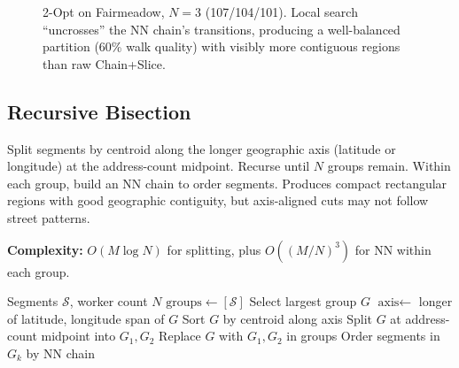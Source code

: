 \documentclass[conference]{IEEEtran}
\begin{document}
\begin{figure}[htbp]
\centering
{}
\caption{2-Opt on Fairmeadow, $N=3$ (107/104/101). Local search ``uncrosses'' the NN chain's transitions, producing a well-balanced partition (60\% walk quality) with visibly more contiguous regions than raw Chain+Slice.}
\end{figure}

\subsection{Recursive Bisection}

Split segments by centroid along the longer geographic axis (latitude or longitude) at the address-count midpoint. Recurse until $N$ groups remain. Within each group, build an NN chain to order segments. Produces compact rectangular regions with good geographic contiguity, but axis-aligned cuts may not follow street patterns.

\textbf{Complexity:} $O(M \log N)$ for splitting, plus $O((M/N)^3)$ for NN within each group.

\begin{algorithm}[htbp]
\caption{Recursive Bisection}
\begin{algorithmic}[1]
\REQUIRE Segments $\mathcal{S}$, worker count $N$
\STATE $\text{groups} \leftarrow [\mathcal{S}]$
    \STATE Select largest group $G$
    \STATE $\text{axis} \leftarrow$ longer of latitude, longitude span of $G$
    \STATE Sort $G$ by centroid along axis
    \STATE Split $G$ at address-count midpoint into $G_1, G_2$
    \STATE Replace $G$ with $G_1, G_2$ in groups
\ENDWHILE
{}
    \STATE Order segments in $G_k$ by NN chain
\ENDFOR
\end{algorithmic}
\end{algorithm}
\end{document}
